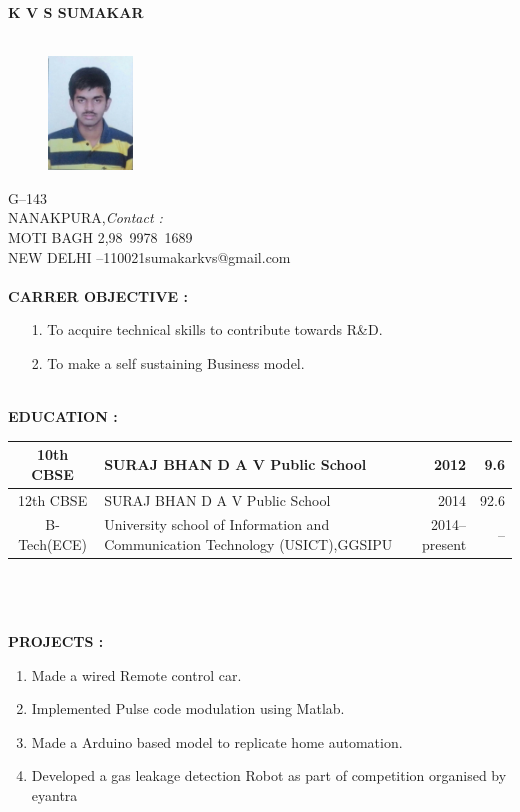 \documentclass{article}
\begin{document}
	
	\begin{center}
			\textbf{K V S SUMAKAR}\\
				\hrulefill\\
		
	\end{center}
	\begin{figure}[h]
		\centering
	\includegraphics[width=0.2\textwidth]{IMG-20160524-WA0002}
	
	\end{figure}
	G--143\\ 
	NANAKPURA,\hfill \textsl{Contact :}\\
	MOTI BAGH 2,\hfill \mbox{98 9978 1689}\\
	NEW DELHI --\mbox{110021}\hfill \mbox{sumakarkvs@gmail.com}\\
	\\
	\leavevmode
	\textbf{CARRER OBJECTIVE :}
	\begin{itemize}
\item[1.] 	To acquire technical skills to contribute towards R\&D.
\item[2.]	To make a self sustaining Business model.\\
	\end{itemize}
	
\leavevmode\\
	\textbf{EDUCATION :\\}

	\begin{tabular}{|c|p{60 mm}|r|r|}
 \hline
		 10th CBSE  &                    SURAJ BHAN D A V Public School                    &            2012 &             9.6 \\ \hline
		 12th CBSE  &                    SURAJ BHAN D A V Public School                    &            2014 &            92.6 \\ \hline
		B-Tech(ECE) & University school of Information and Communication Technology (USICT),GGSIPU &   2014--present &              -- \\ \hline
	\end{tabular}
	\\
	\\
\leavevmode
\\
	\textbf{PROJECTS :}
	\begin{enumerate}
		\item Made a wired Remote control car.
		\item Implemented Pulse code modulation using Matlab.
		\item Made a Arduino based model to replicate home automation.
		\item Developed a gas leakage detection Robot as part of competition organised by eyantra
	\end{enumerate}
\end{document}
